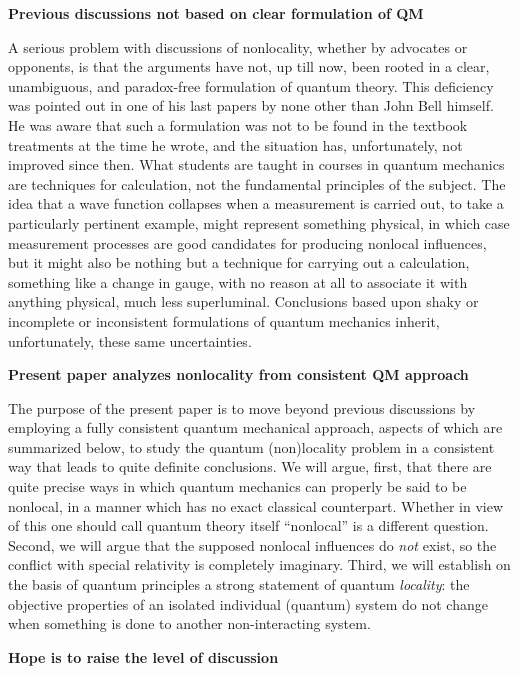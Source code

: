 \documentclass[12pt]{article} %
\def\outl#1{\par{\medskip\noindent\hspace*{.5cm}\bf
      \mathversion{bold}#1\mathversion{normal}\smallskip} }
\def\np{} \def\xa{} \def\xb{} \def\xn{} \def\xp{}
\def\outl#1{} \def\np{} \def\xa{} \def\xb{} \def\xn{} \def\xp{}
\def\outl#1{\par{\medskip\noindent\hspace*{.5cm}\bf
      \mathversion{bold}#1\mathversion{normal}\smallskip} }
\def\np{\newpage }\def\xn{\nopagebreak }\def\xp{\pagebreak }
\begin{document}
\xb
\outl{Previous discussions not based on clear formulation of QM}
\xa




A serious problem with discussions of nonlocality, whether by advocates or
opponents, is that the arguments have not, up till now, been rooted in a
clear, unambiguous, and paradox-free formulation of quantum theory.  This
deficiency was pointed out in one of his last papers \cite{Bll90} by none
other than John Bell himself.  He was aware that such a formulation was not to
be found in the textbook treatments at the time he wrote, and the situation
has, unfortunately, not improved since then.  What students are taught in
courses in quantum mechanics are techniques for calculation, not the
fundamental principles of the subject.  The idea that a wave function
collapses when a measurement is carried out, to take a particularly pertinent
example, might represent something physical, in which case measurement
processes are good candidates for producing nonlocal influences, but it might
also be nothing but a technique for carrying out a calculation, something like
a change in gauge, with no reason at all to associate it with anything
physical, much less superluminal.  Conclusions based upon shaky or incomplete
or inconsistent formulations of quantum mechanics inherit, unfortunately,
these same uncertainties.

\xb
\outl{Present paper analyzes nonlocality from consistent QM approach}
\xa



The purpose of the present paper is to move beyond previous discussions by
employing a fully consistent quantum mechanical approach, aspects of which are
summarized below, to study the quantum (non)locality problem in a consistent
way that leads to quite definite conclusions.  We will argue, first, that
there are quite precise ways in which quantum mechanics can properly be said
to be nonlocal, in a manner which has no exact classical counterpart. Whether
in view of this one should call quantum theory itself ``nonlocal'' is a
different question. Second, we will argue that the supposed nonlocal
influences do \emph{not} exist, so the conflict with special relativity is
completely imaginary.  Third, we will establish on the basis of quantum
principles a strong statement of quantum \emph{locality}: the objective
properties of an isolated individual (quantum) system do not change when
something is done to another non-interacting system.

\xb
\outl{Hope is to raise the level of discussion}
\xa
\end{document}
